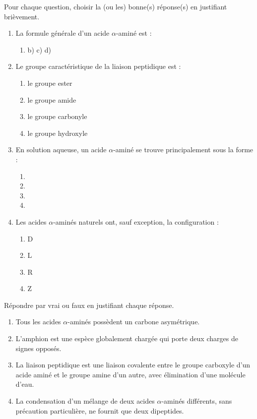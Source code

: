 \documentclass[11pt]{article}
\begin{document}
\begin{exercice}
Pour chaque question, choisir la (ou les) bonne(s) réponse(s) en justifiant brièvement.
\begin{enumerate}
\item La formule générale d'un acide $\alpha$-aminé est :
\begin{enumerate}
\item {} \quad b)  \quad c)  \quad d) 
\end{enumerate}
\item Le groupe caractéristique de la liaison peptidique est :
\begin{enumerate}
\item le groupe ester \item le groupe amide \item le groupe carbonyle \item le groupe hydroxyle
\end{enumerate}
\item En solution aqueuse, un acide $\alpha$-aminé se trouve principalement sous la forme :
\begin{enumerate}
\item {} \item {} \item {} \item {}
\end{enumerate}
\item Les acides $\alpha$-aminés naturels ont, sauf exception, la configuration :
\begin{enumerate}
\item D \item L \item R \item Z
\end{enumerate}
\end{enumerate}
\end{exercice}

\begin{exercice}
Répondre par vrai ou faux en justifiant chaque réponse.
\begin{enumerate}
\item Tous les acides $\alpha$-aminés possèdent un carbone asymétrique.
\item L'amphion est une espèce globalement chargée qui porte deux charges de signes opposés.
\item La liaison peptidique est une liaison covalente entre le groupe carboxyle d'un acide aminé et le groupe amine d'un autre, avec élimination d'une molécule d'eau.
\item La condensation d'un mélange de deux acides $\alpha$-aminés différents, sans précaution particulière, ne fournit que deux dipeptides.
\end{enumerate}
\end{exercice}
\end{document}
